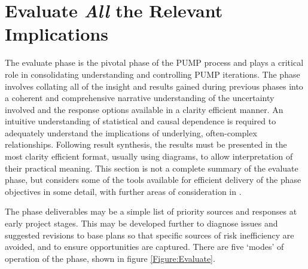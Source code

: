 \section{Evaluate \textit{All} the Relevant Implications} \label{s:Evaluate}



The evaluate phase is the pivotal phase of the PUMP process and plays a critical role in consolidating understanding and controlling PUMP iterations.
The phase involves collating all of the insight and results gained during previous phases into a coherent and comprehensive narrative understanding of the uncertainty involved and the response options available in a clarity efficient manner.
An intuitive understanding of statistical and causal dependence is required to adequately understand the implications of underlying, often-complex relationships.
Following result synthesis, the results must be presented in the most clarity efficient format, usually using diagrams, to allow interpretation of their practical meaning.
This section is not a complete summary of the evaluate phase, but considers some of the tools available for efficient delivery of the phase objectives in some detail, with further areas of consideration in \cite{chapman}.

The phase deliverables may be a simple list of priority sources and responses at early project stages.
This may be developed further to diagnose issues and suggested revisions to base plans so that specific sources of risk inefficiency are avoided, and to ensure opportunities are captured.
There are five `modes' of operation of the phase, shown in figure \ref{Figure:Evaluate}.

